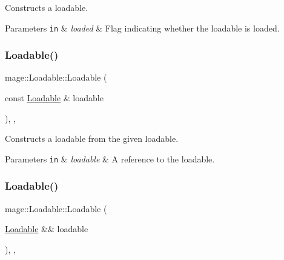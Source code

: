 Constructs a loadable.


\begin{DoxyParams}[1]{Parameters}
\mbox{\tt in}  & {\em loaded} & Flag indicating whether the loadable is loaded. \\
\hline
\end{DoxyParams}
\hypertarget{classmage_1_1_loadable_aefd54800fd0711bdcb9c66d8df3c25a5}{}\label{classmage_1_1_loadable_aefd54800fd0711bdcb9c66d8df3c25a5} 
\subsubsection{\texorpdfstring{Loadable()}{Loadable()}\hspace{0.1cm}{\footnotesize\ttfamily [2/3]}}
{\footnotesize\ttfamily mage\+::\+Loadable\+::\+Loadable (\begin{DoxyParamCaption}\item[{const \hyperlink{classmage_1_1_loadable}{Loadable} \&}]{loadable }\end{DoxyParamCaption})\hspace{0.3cm}{\ttfamily [protected]}, {\ttfamily [default]}, {\ttfamily [noexcept]}}

Constructs a loadable from the given loadable.


\begin{DoxyParams}[1]{Parameters}
\mbox{\tt in}  & {\em loadable} & A reference to the loadable. \\
\hline
\end{DoxyParams}
\hypertarget{classmage_1_1_loadable_ad41faf3735ef05dd2828b8ab3d1b6a78}{}\label{classmage_1_1_loadable_ad41faf3735ef05dd2828b8ab3d1b6a78} 
\subsubsection{\texorpdfstring{Loadable()}{Loadable()}\hspace{0.1cm}{\footnotesize\ttfamily [3/3]}}
{\footnotesize\ttfamily mage\+::\+Loadable\+::\+Loadable (\begin{DoxyParamCaption}\item[{\hyperlink{classmage_1_1_loadable}{Loadable} \&\&}]{loadable }\end{DoxyParamCaption})\hspace{0.3cm}{\ttfamily [protected]}, {\ttfamily [default]}, {\ttfamily [noexcept]}}

